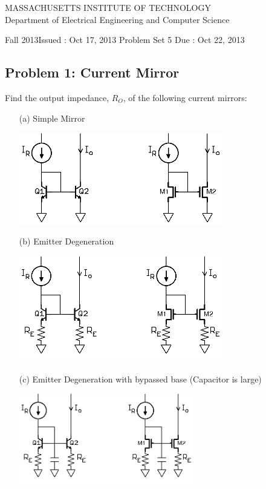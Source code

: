 \documentclass[11pt,twoside]{article}
\newlength{\toppush}
\newcommand{\htitle}[3]{\begin{center}
\vspace*{-\toppush}
{\large MASSACHUSETTS INSTITUTE OF TECHNOLOGY}\\
{\small Department of Electrical Engineering and Computer Science}\\
\vspace*{1ex}{\Large #2}\end{center}
\noindent
\newline\parbox{6.5in}
{Fall 2013\hfill Issued : #1 \newline
 Problem Set 5 \hfill Due : #3\newline
}}
\newcommand{\handout}[3]{\thispagestyle{empty}
\pagestyle{myheadings}\htitle{#1}{#2}{#3}}
\begin{document}
\handout{Oct 17, 2013}{6.301 Solid State Circuits}{Oct 22, 2013}
\setlength{\parindent}{0pt}

\newcommand{\solution}{
 \medskip
 {\bf Solution:}
}

\hrulefill

\flushleft

\subsection*{Problem 1: Current Mirror}
	Find the output impedance, $R_O$, of the following current mirrors:
\begin{enumerate}
	\item[(a)] Simple Mirror
\begin{center}
\includegraphics[width=0.7\textwidth]{mirror.png}
\end{center}
	\item[(b)] Emitter Degeneration
\begin{center}
\includegraphics[width=0.7\textwidth]{emitter-degen.png}
\end{center}
\clearpage
	\item[(c)] Emitter Degeneration	with bypassed base (Capacitor is large)
\begin{center}
\includegraphics[width=0.6\textwidth]{emitter-degen-cap.png}
\end{center}


\end{enumerate}
\end{document}
